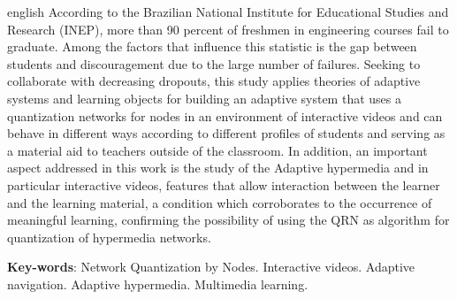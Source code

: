 \begin{resumo}[Abstract]
 \begin{otherlanguage*}{english}
According to the Brazilian National Institute for Educational Studies and Research (INEP), more than 90 percent of freshmen in engineering courses fail to graduate. Among the factors that influence this statistic is the gap between students and discouragement due to the large number of failures. Seeking to collaborate with decreasing dropouts, this study applies theories of adaptive systems and learning objects for building an adaptive system that uses a quantization networks for nodes in an environment of interactive videos and can behave in different ways according to different profiles of students and serving as a material aid to teachers outside of the classroom. In addition, an important aspect addressed in this work is the study of the Adaptive hypermedia and in particular interactive videos, features that allow interaction between the learner and the learning material, a condition which corroborates to the occurrence of meaningful learning, confirming the possibility of using the QRN as algorithm for quantization of hypermedia networks.

   \vspace{\onelineskip}
 
   \noindent 
   \textbf{Key-words}: Network Quantization by Nodes. Interactive videos. Adaptive navigation. Adaptive hypermedia. Multimedia learning.
 \end{otherlanguage*}
\end{resumo}
